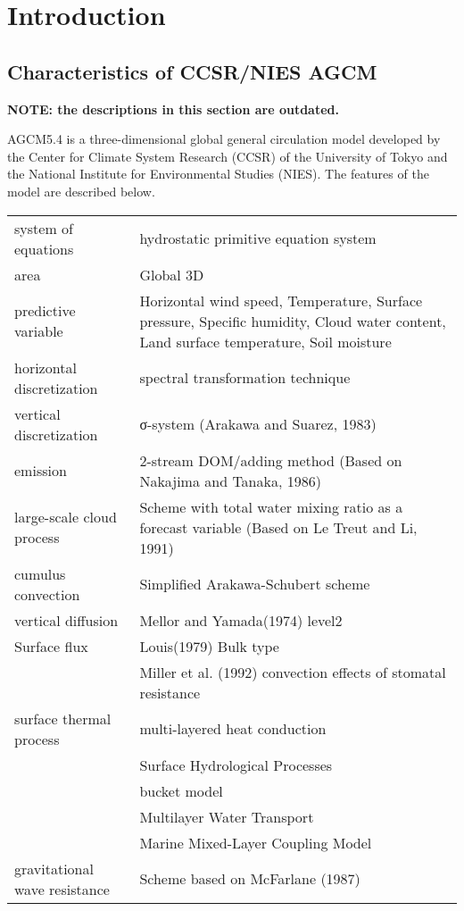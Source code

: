 \hypertarget{introduction}{%
\section{Introduction}\label{introduction}}


\hypertarget{characteristics-of-ccsrnies-agcm}{%
\subsection{Characteristics of CCSR/NIES
AGCM}\label{characteristics-of-ccsrnies-agcm}}

\textbf{NOTE: the descriptions in this section are outdated.}

AGCM5.4 is a three-dimensional global general circulation model
developed by the Center for Climate System Research (CCSR) of the
University of Tokyo and the National Institute for Environmental Studies
(NIES). The features of the model are described below.

\begin{table}[hp]
\begin{tabular}{ll}
system of equations & hydrostatic primitive equation system \\
area & Global 3D \\
predictive variable & Horizontal wind speed, Temperature, Surface
pressure, Specific humidity, Cloud water content, Land surface
temperature, Soil moisture \\
horizontal discretization & spectral transformation technique \\
vertical discretization & σ-system (Arakawa and Suarez, 1983) \\
emission & 2-stream DOM/adding method (Based on Nakajima and Tanaka, 1986) \\
large-scale cloud process & Scheme with total water mixing ratio as a
forecast variable (Based on Le Treut and Li, 1991) \\
cumulus convection & Simplified Arakawa-Schubert scheme \\
vertical diffusion & Mellor and Yamada(1974) level2 \\
Surface flux & Louis(1979) Bulk type \\
 & Miller et
al. (1992) convection effects of stomatal resistance \\
surface thermal process & multi-layered heat conduction \\
& Surface Hydrological Processes \\
& bucket model \\
& Multilayer Water Transport \\
& Marine Mixed-Layer Coupling Model \\
gravitational wave resistance & Scheme based on McFarlane (1987) \\
\end{tabular}
\end{table}
